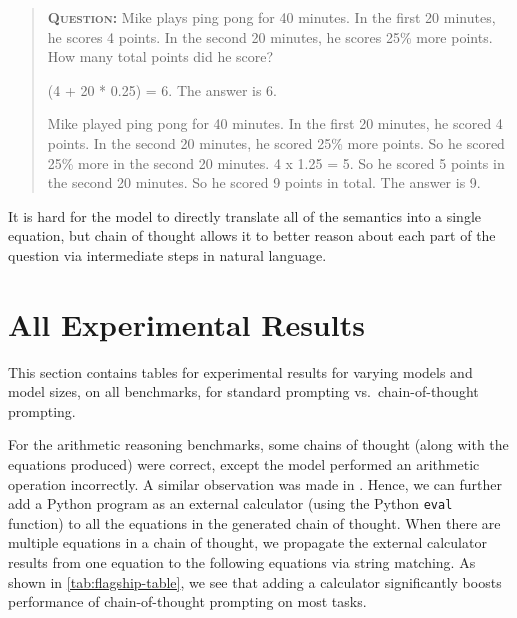 \documentclass[]{article}
\theoremstyle{plain}
\theoremstyle{definition}
\theoremstyle{remark}
\begin{document}
\begin{quote}
{\small{\textbf{\textsc{Question:}} Mike plays ping pong for 40 minutes. In the first 20 minutes, he scores 4 points. In the second 20 minutes, he scores 25\% more points.  How many total points did he score?}}

{\small{\textbf{\textsc{\color{blue}{Equation only (wrong answer):}}} (4 + 20 * 0.25) = 6. The answer is 6.}}

{\small{\textbf{\textsc{\color{darkGreen}{Chain of thought (correct):}}} Mike played ping pong for 40 minutes. In the first 20 minutes, he scored 4 points. In the second 20 minutes, he scored 25\% more points. So he scored 25\% more in the second 20 minutes. 4 x 1.25 = 5. So he scored 5 points in the second 20 minutes. So he scored 9 points in total. The answer is 9.}}
\end{quote}

It is hard for the model to directly translate all of the semantics into a single equation, but chain of thought allows it to better reason about each part of the question via intermediate steps in natural language. 


\clearpage
\section{All Experimental Results}\label{sec:all-results}

This section contains tables for experimental results for varying models and model sizes, on all benchmarks, for standard prompting vs.\ chain-of-thought prompting.

For the arithmetic reasoning benchmarks, some chains of thought (along with the equations produced) were correct, except the model performed an arithmetic operation incorrectly. 
A similar observation was made in \citet{cobbe2021training}.
Hence, we can further add a Python program as an external calculator (using the Python \texttt{\small eval} function) to all the equations in the generated chain of thought. 
When there are multiple equations in a chain of thought, we propagate the external calculator results from one equation to the following equations via string matching.
As shown in \cref{tab:flagship-table}, we see that adding a calculator significantly boosts performance of chain-of-thought prompting on most tasks.
\end{document}
